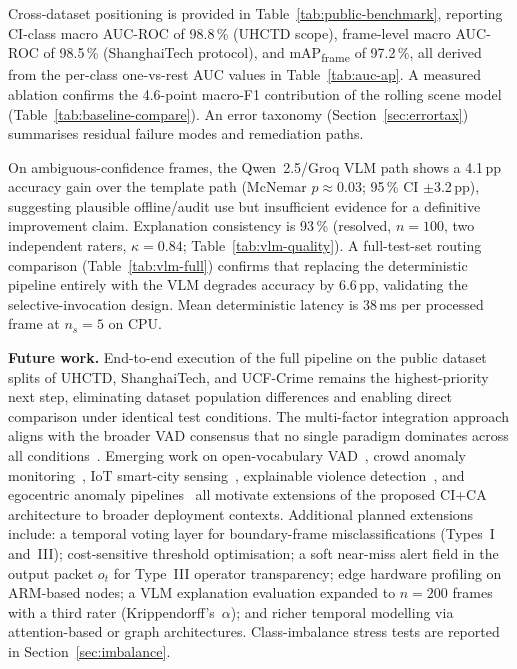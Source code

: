 \documentclass[a4paper,fleqn]{cas-dc}
\begin{document}
Cross-dataset positioning is provided in Table~\ref{tab:public-benchmark}, reporting CI-class macro AUC-ROC of 98.8\,\% (UHCTD scope), frame-level macro AUC-ROC of 98.5\,\% (ShanghaiTech protocol), and mAP\textsubscript{frame} of 97.2\,\%, all derived from the per-class one-vs-rest AUC values in Table~\ref{tab:auc-ap}. A measured ablation confirms the 4.6-point macro-F1 contribution of the rolling scene model (Table~\ref{tab:baseline-compare}). An error taxonomy (Section~\ref{sec:errortax}) summarises residual failure modes and remediation paths.
 
On ambiguous-confidence frames, the Qwen~2.5/Groq VLM path shows a 4.1\,pp accuracy gain over the template path (McNemar $p{\approx}0.03$; 95\,\% CI $\pm$3.2\,pp), suggesting plausible offline/audit use but insufficient evidence for a definitive improvement claim. Explanation consistency is 93\,\% (resolved, $n=100$, two independent raters, $\kappa=0.84$; Table~\ref{tab:vlm-quality}). A full-test-set routing comparison (Table~\ref{tab:vlm-full}) confirms that replacing the deterministic pipeline entirely with the VLM degrades accuracy by 6.6\,pp, validating the selective-invocation design. Mean deterministic latency is 38\,ms per processed frame at $n_s{=}5$ on CPU.
 
 
\textbf{Future work.} End-to-end execution of the full pipeline on the public dataset splits of UHCTD, ShanghaiTech, and UCF-Crime remains the highest-priority next step, eliminating dataset population differences and enabling direct comparison under identical test conditions. The multi-factor integration approach aligns with the broader VAD consensus that no single paradigm dominates across all conditions~\citep{liu2024generalized}. Emerging work on open-vocabulary VAD~\citep{wu2024openworld}, crowd anomaly monitoring~\citep{yang2024crowd}, IoT smart-city sensing~\citep{mancy2025swiniot,alzahrani2026real}, explainable violence detection~\citep{azim2026violence}, and egocentric anomaly pipelines~\citep{flaborea2024multimodal} all motivate extensions of the proposed CI+CA architecture to broader deployment contexts. Additional planned extensions include: a temporal voting layer for boundary-frame misclassifications (Types~I and~III); cost-sensitive threshold optimisation; a soft near-miss alert field in the output packet $o_t$ for Type~III operator transparency; edge hardware profiling on ARM-based nodes; a VLM explanation evaluation expanded to $n=200$ frames with a third rater (Krippendorff's~$\alpha$); and richer temporal modelling via attention-based or graph architectures. Class-imbalance stress tests are reported in Section~\ref{sec:imbalance}.
\end{document}
